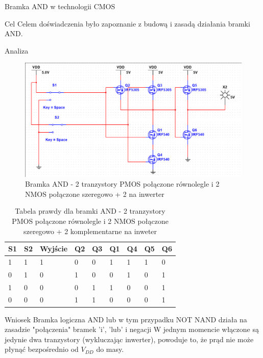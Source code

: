 \documentclass[a4paper]{scrartcl}
\begin{document}
	\clearpage
	\begin{section}{Bramka AND w technologii CMOS}
		\begin{subsection}{Cel}
			Celem doświadczenia było zapoznanie z budową i zasadą działania bramki AND.
		\end{subsection}
		\begin{subsection}{Analiza}
				\begin{figure}[ht]
				\begin{center}
					\includegraphics[width=0.8\linewidth]{exercise-9-and-gate-circuit}
					\caption{Bramka AND - 2 tranzystory PMOS połączone równolegle i 2 NMOS połączone szeregowo + 2 na inwerter}
					\label{fig:circuit-7-cmos}
				\end{center}
				\end{figure}
				\begin{table}[!ht]
					\begin{center}
					\caption{Tabela prawdy dla bramki AND - 2 tranzystory PMOS połączone równolegle i 2 NMOS połączone szeregowo + 2 komplementarne na inweter}
					\begin{tabular}{| l | l | l | l | l | l | l | l | l |}
						\hline
						S1 & S2 & Wyjście & Q2 & Q3 & Q1 & Q4 & Q5 & Q6 \\\hline
						1 & 1 & 1 & 0 & 0 & 1 & 1 & 1 & 0 \\ \hline
						0 & 1 & 0 & 1 & 0 & 0 & 1 & 0 & 1 \\ \hline
						1 & 0 & 0 & 0 & 1 & 1 & 0 & 0 & 1 \\ \hline
						0 & 0 & 0 & 1 & 1 & 0 & 0 & 0 & 1 \\ \hline
					\end{tabular}
					\end{center}
				\end{table}
		\end{subsection}
		\begin{subsection}{Wniosek}
			Bramka logiczna AND lub w tym przypadku NOT NAND działa na zasadzie "połączenia" bramek 'i', 'lub' i negacji W jednym momencie włączone są jedynie dwa tranzystory (wykluczając inwerter), powoduje to, że prąd nie może płynąć bezpośrednio od $ V_{DD} $ do masy.
		\end{subsection}
	\end{section}
\end{document}
